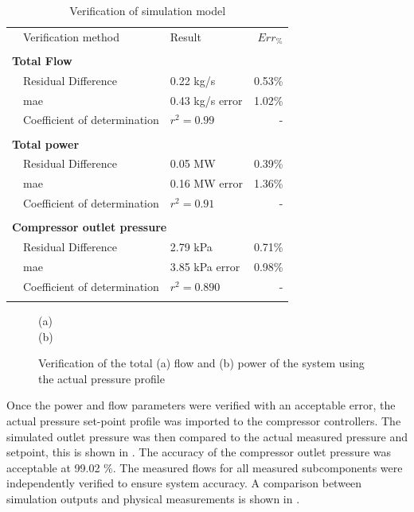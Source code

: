  \begin{table}[h!]
 	\label{Kus verification table}
 	\centering
 	\begin{tabular}{p{0.5cm}p{8cm}p{5cm}r}
 		\hline
 		&Verification method & Result & $Err_{\%}$\\
 		\hhline{====}
 		\\ \multicolumn{4}{l}{\textbf{ Total Flow}}\\
 		&Residual Difference  & 0.22 kg/s & 0.53\% \\
 		&\gls{mae} 					 & 0.43 kg/s error & 1.02\% \\
 		&Coefficient of determination & $r^2 =0.99$ & -\\ 
 		\\ \multicolumn{4}{l}{\textbf{ Total power}}\\
 		&Residual Difference  & 0.05 MW & 0.39\% \\
 		&\gls{mae} 					 & 0.16 MW error & 1.36\% \\
 		&Coefficient of determination & $r^2 =0.91$ & -\\ 
 		\\ \multicolumn{4}{l}{\textbf{ Compressor outlet pressure}}\\
 		&Residual Difference  & 2.79 kPa & 0.71\% \\
 		&\gls{mae} 					 & 3.85 kPa error & 0.98\% \\
 		&Coefficient of determination & $r^2 =0.890$ & -\\
 		\\ 	\hline
 	\end{tabular} 
 	\caption{Verification of simulation model}
 \end{table}

	\begin{figure}[h!]
		\centering
		
		(a)\\
		
		(b)\\
		\caption{Verification of the total (a) flow and (b) power of the system using the actual pressure profile}
		\label{fig: Verification Power kusasalethu}
	\end{figure}

	Once the power and flow parameters were verified with an acceptable error, the actual pressure set-point profile was imported to the compressor controllers. The simulated outlet pressure was then compared to the actual measured pressure and setpoint, this is shown in . The accuracy of the compressor outlet pressure was acceptable at 99.02 \%. The measured flows for all measured subcomponents were independently verified to ensure system accuracy. A comparison between simulation outputs and physical measurements is shown in .

